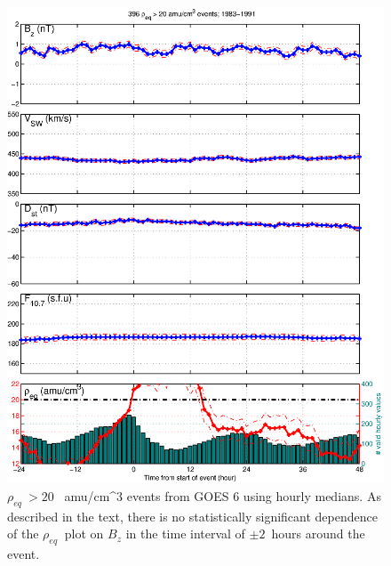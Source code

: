\documentclass[10pt,twocolumn]{article}
\newcommand{\req}{\ensuremath{\rho_{eq}}}
\begin{document}
\begin{figure}[htp!]
	\centering
	\includegraphics[scale=0.40]{paperfigures/stormavs-mass-gt20-GOES6.eps}
\caption{$\req\ > 20$~ amu/cm^3 events from GOES 6 using hourly medians. As described in the text, there is no statistically significant dependence of the $\req\ $ plot on $B_z$ in the time interval of $\pm 2$~hours around the event.}
\label{HourlyAveragedRhoEvents}
\end{figure}
\end{document}
